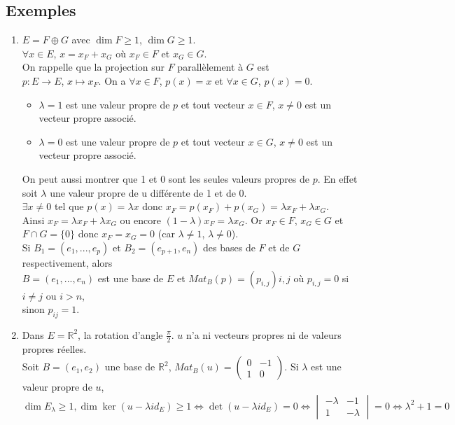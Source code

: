 \documentclass[a4paper,10pt]{book} %
\newcommand{\R}{\mathbb{R}}
\begin{document}
\subsection*{Exemples}
\begin{enumerate}
\item $E=F\oplus G$ avec $\dim F\geq 1$, $\dim G\geq 1$.\\

$\forall x\in E$, $x=x_F+x_G$ où $x_F\in F$ et $x_G\in G$.\\

On rappelle que la projection sur $F$ parallèlement à $G$ est\\$p:E\rightarrow E$, $x\mapsto x_F$. On a $\forall x\in F$, $p(x)=x$ et $\forall x\in G$, $p(x)=0$.\\

\begin{itemize}
\item $\lambda=1$ est une valeur propre de $p$ et tout vecteur $x\in F$, $x\neq 0$ est un vecteur propre associé.
\item $\lambda=0$ est une valeur propre de $p$ et tout vecteur $x \in G$, $x\neq 0$ est un vecteur propre associé.
\end{itemize}

On peut aussi montrer que 1 et 0 sont les seules valeurs propres de $p$. En effet soit $\lambda$ une valeur propre de u différente de 1 et de 0.\\

$\exists x\neq 0$ tel que $p(x)=\lambda x$ donc $x_F=p(x_F)+p(x_G)=\lambda x_F+\lambda x_G$.\\
Ainsi $x_F=\lambda x_F+\lambda x_G$ ou encore $(1-\lambda)x_F=\lambda x_G$. Or $x_F\in F$, $x_G\in G$ et $F\cap G=\{0\}$ donc $x_F=x_G=0$ (car $\lambda\neq 1$, $\lambda \neq 0$).\\

Si $B_1=(e_1,...,e_p)$ et $B_2=(e_{p+1},e_n)$ des bases de $F$ et de $G$ respectivement, alors\\$B=(e_1,...,e_n)$ est une base de $E$ et $Mat_B(p)=(p_{i,j}){i,j}$ où $p_{i,j}=0$ si $i\neq j$ ou $i>n$,\\sinon $p_{ij}=1$.\\

\item Dans $E=\R^2$, la rotation d'angle $\frac{\pi}{2}$. $u$ n'a ni vecteurs propres ni de valeurs propres réelles.\\

Soit $B=(e_1,e_2)$ une base de $\R^2$, $Mat_B(u)=\begin{pmatrix}
0&-1\\1&0
\end{pmatrix}$. Si $\lambda$ est une valeur propre de $u$,
$$\dim E_\lambda\geq 1, \dim\ker(u-\lambda id_E)\geq 1 \Leftrightarrow \det(u-\lambda id_E)=0 \Leftrightarrow\begin{vmatrix}
-\lambda&-1\\1&-\lambda
\end{vmatrix}=0 \Leftrightarrow \lambda^2+1=0$$
\end{enumerate}
\end{document}
